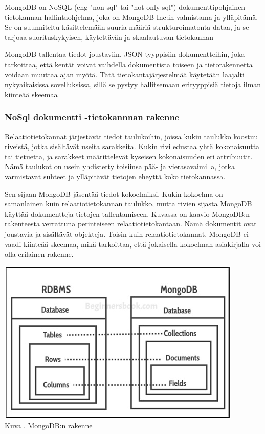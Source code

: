 





MongoDB on NoSQL (eng "non sql"{} tai "not only sql"{}) dokumenttipohjainen tietokannan hallintaohjelma,
joka on MongoDB Inc:in valmistama ja ylläpitämä.
Se on suunniteltu käsittelemään suuria määriä strukturoimatonta dataa,
ja se tarjoaa suorituskykyisen, käytettävän ja skaalautuvan tietokannan
\medskip




MongoDB tallentaa tiedot joustaviin, JSON-tyyppisiin dokumentteihin, 
joka tarkoittaa, että kentät voivat vaihdella dokumentista toiseen ja tietorakennetta voidaan muuttaa ajan myötä. 
Tätä tietokantajärjestelmää käytetään laajalti nykyaikaisissa sovelluksissa, 
sillä se pystyy hallitsemaan erityyppisiä tietoja ilman kiinteää skeemaa
\medskip



\subsubsection{NoSql dokumentti -tietokannnan rakenne}




Relaatiotietokannat järjestävät tiedot taulukoihin,
joissa kukin taulukko koostuu riveistä, jotka sisältävät useita sarakkeita.
Kukin rivi edustaa yhtä kokonaisuutta tai tietuetta, ja sarakkeet määrittelevät kyseisen kokonaisuuden eri attribuutit.
Nämä taulukot on usein yhdistetty toisiinsa pää- ja vierasavaimilla,
jotka varmistavat suhteet ja ylläpitävät tietojen eheyttä koko tietokannassa.
\medskip

Sen sijaan MongoDB jäsentää tiedot kokoelmiksi.
Kukin kokoelma on samanlainen kuin relaatiotietokannan taulukko,
mutta rivien sijasta MongoDB käyttää dokumentteja tietojen tallentamiseen.
Kuvassa \nextImageCount{} on kaavio MongoDB:n rakenteesta verrattuna perinteiseen relaatiotietokantaan. 
Nämä dokumentit ovat joustavia ja sisältävät objekteja.
Toisin kuin relaatiotietokannat, MongoDB ei vaadi kiinteää skeemaa, mikä tarkoittaa, 
että jokaisella kokoelman asiakirjalla voi olla erilainen rakenne.
\medskip

\bigskip
\includegraphics{src/public/oppar/mongodb-structure.jpg} \\
Kuva \getImgCount. MongoDB:n rakenne
\medskip


